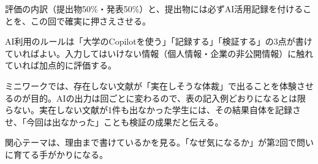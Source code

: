 \begin{point}
  \item 評価の内訳（提出物50\%・発表50\%）と、提出物には必ずAI活用記録を付けることを、この回で確実に押さえさせる。
  \item AI利用のルールは「大学のCopilotを使う」「記録する」「検証する」の3点が書けていればよい。入力してはいけない情報（個人情報・企業の非公開情報）に触れていれば加点的に評価する。
  \item ミニワークでは、存在しない文献が「実在しそうな体裁」で出ることを体験させるのが目的。AIの出力は回ごとに変わるので、表の記入例どおりになるとは限らない。実在しない文献が1件も出なかった学生には、その結果自体を記録させ、「今回は出なかった」ことも検証の成果だと伝える。
  \item 関心テーマは、理由まで書けているかを見る。「なぜ気になるか」が第2回で問いに育てる手がかりになる。
\end{point}
